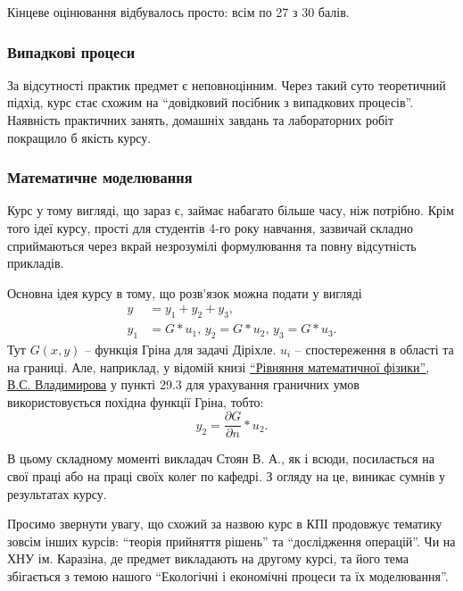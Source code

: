 \documentclass[14pt, a4paper]{extarticle}  %
\begin{document}
Кінцеве оцінювання відбувалось просто: всім по 27 з 30 балів. 

\subsubsection{Випадкові процеси}

За відсутності практик предмет є неповноцінним. Через такий суто теоретичний підхід, курс стає схожим на ``довідковий посібник з випадкових процесів''. Наявність практичних занять, домашніх завдань та лабораторних робіт покращило б якість курсу. 

\subsubsection{Математичне моделювання}
Курс у тому вигляді, що зараз є, займає набагато більше часу, ніж потрібно. Крім того ідеї курсу, прості для студентів 4-го року навчання, зазвичай складно сприймаються через вкрай незрозумілі формулювання та повну відсутність прикладів. 

Основна ідея курсу в тому, що розв'язок можна подати у вигляді 
\begin{align*}
   y &= y_1 + y_2 + y_3, \\
   y_1 &= G * u_1, \, y_2 = G * u_2, \, y_3 = G * u_3.
\end{align*}
Тут $G(x, y)$ -- функція Гріна для задачі Діріхле. $u_i$ -- спостереження в області та на границі. Але, наприклад, у відомій книзі \href{http://cmcstuff.esyr.org/vmkbotva-r15/4\%20\%D0\%BA\%D1\%83\%D1\%80\%D1\%81/8\%20\%D0\%A1\%D0\%B5\%D0\%BC\%D0\%B5\%D1\%81\%D1\%82\%D1\%80/PDE\%20Extra\%20Chapters\%20\%5BHapaev\%20M.M.\%5D/\%D0\%92.\%D0\%A1.\%20\%D0\%92\%D0\%BB\%D0\%B0\%D0\%B4\%D0\%B8\%D0\%BC\%D0\%B8\%D1\%80\%D0\%BE\%D0\%B2.\%20\%D0\%A3\%D1\%80\%D0\%B0\%D0\%B2\%D0\%BD\%D0\%B5\%D0\%BD\%D0\%B8\%D1\%8F\%20\%D0\%BC\%D0\%B0\%D1\%82\%D0\%B5\%D0\%BC\%D0\%B0\%D1\%82\%D0\%B8\%D1\%87\%D0\%B5\%D1\%81\%D0\%BA\%D0\%BE\%D0\%B9\%20\%D1\%84\%D0\%B8\%D0\%B7\%D0\%B8\%D0\%BA\%D0\%B8.pdf}{``Рівняння математичної фізики'', В.С. Владимирова} у пункті 29.3 для урахування граничних умов використовується похідна функції Гріна, тобто:
\[ y_2 = \frac{\partial G}{\partial n} * u_2. \]

В цьому складному моменті викладач Стоян В. А., як і всюди, посилається на свої праці або на праці своїх колег по кафедрі. З огляду на це, виникає сумнів у результатах курсу. 

Просимо звернути увагу, що схожий за назвою курс в КПІ продовжує тематику зовсім інших курсів: ``теорія прийняття рішень'' та ``дослідження операцій''. Чи на ХНУ ім. Каразіна, де предмет викладають на другому курсі, та його тема збігається з темою нашого ``Екологічні і економічні процеси та їх моделювання''. 
\end{document}
